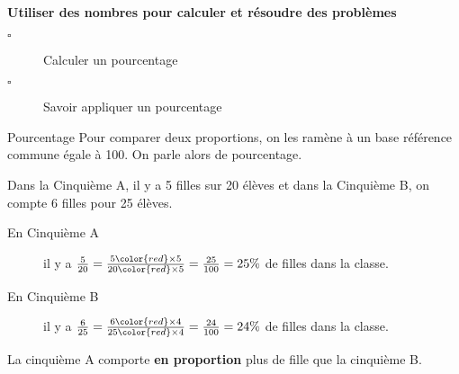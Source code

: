\documentclass[openany]{book}
\begin{document}
\Exe



\Exe




\begin{seance}[Proportionnalité]
\textbf{Utiliser des nombres pour calculer et résoudre des problèmes}
\begin{description}
\item[$\square$] Calculer un pourcentage
\item[$\square$] Savoir appliquer un pourcentage
\end{description}
\end{seance}

\Exe




\begin{DefT}{Pourcentage}
Pour comparer deux proportions, on les ramène à un base référence commune égale à 100. On parle alors de  pourcentage.
\end{DefT}

\begin{Ex}
Dans la Cinquième A, il y a 5 filles sur 20 élèves et dans la Cinquième B, on compte 6 filles pour 25 élèves.
\begin{description}
\item[En Cinquième A] il y a $\frac{5}{20}=\frac{5 {\color{red}\times 5} }{20 {\color{red}\times 5}} = \frac{25}{100} = 25\%$ de filles dans la classe.
\item[En Cinquième B] il y a $\frac{6}{25}=\frac{6 {\color{red}\times 4} }{25 {\color{red}\times 4}} = \frac{24}{100} = 24\%$ de filles dans la classe.
\end{description}
La cinquième A comporte \textbf{en proportion} plus de fille que la cinquième B.
\end{Ex}


\Exe




\begin{minipage}{0.49\linewidth}
\Exe



\end{minipage}
\hfill\hfill
\begin{minipage}{0.49\linewidth}

\Exe


\end{minipage}

\Exe
\end{document}
